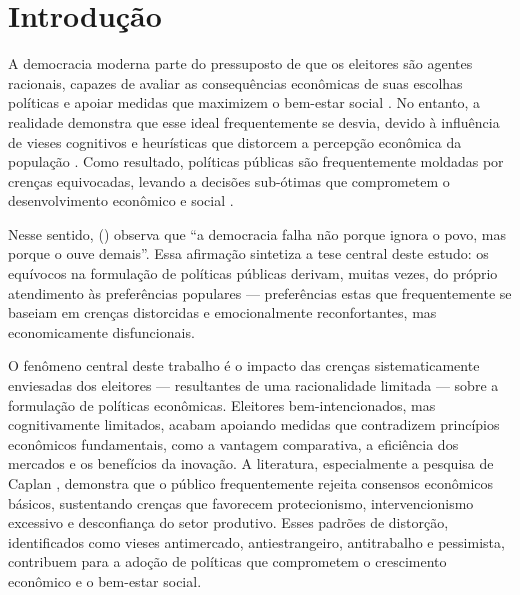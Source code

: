 

\chapter{Introdução} %


A democracia moderna parte do pressuposto de que os eleitores são agentes racionais, capazes de avaliar as consequências econômicas de suas escolhas políticas e apoiar medidas que maximizem o bem-estar social \cite{downs1957economic}. No entanto, a realidade demonstra que esse ideal frequentemente se desvia, devido à influência de vieses cognitivos e heurísticas que distorcem a percepção econômica da população \cite{The_Myth_of_the_Rational_Voter,kahneman2011thinking}. Como resultado, políticas públicas são frequentemente moldadas por crenças equivocadas, levando a decisões sub-ótimas que comprometem o desenvolvimento econômico e social \cite{acemoglu2012nations}.

Nesse sentido,  (\citeyear{The_Myth_of_the_Rational_Voter}) observa que ``a democracia falha não porque ignora o povo, mas porque o ouve demais''. Essa afirmação sintetiza a tese central deste estudo: os equívocos na formulação de políticas públicas derivam, muitas vezes, do próprio atendimento às preferências populares — preferências estas que frequentemente se baseiam em crenças distorcidas e emocionalmente reconfortantes, mas economicamente disfuncionais.

O fenômeno central deste trabalho é o impacto das crenças sistematicamente enviesadas dos eleitores — resultantes de uma racionalidade limitada — sobre a formulação de políticas econômicas. Eleitores bem-intencionados, mas cognitivamente limitados, acabam apoiando medidas que contradizem princípios econômicos fundamentais, como a vantagem comparativa, a eficiência dos mercados e os benefícios da inovação. A literatura, especialmente a pesquisa de Caplan \citeyear{Systematically_Biased_Beliefs_about_Economics,The_Myth_of_the_Rational_Voter}, demonstra que o público frequentemente rejeita consensos econômicos básicos, sustentando crenças que favorecem protecionismo, intervencionismo excessivo e desconfiança do setor produtivo. Esses padrões de distorção, identificados como vieses antimercado, antiestrangeiro, antitrabalho e pessimista, contribuem para a adoção de políticas que comprometem o crescimento econômico e o bem-estar social.

